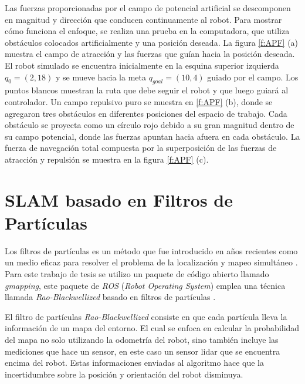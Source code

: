 Las fuerzas proporcionadas por el campo de potencial artificial se descomponen en 
magnitud y dirección que conducen continuamente al robot. Para mostrar cómo funciona el 
enfoque, se realiza una prueba en la computadora, que utiliza obstáculos 
colocados artificialmente y una posición deseada. La figura \ref{f:APF} (a) muestra el campo 
de atracción y las fuerzas que guían hacia la posición deseada. El robot simulado se 
encuentra inicialmente en la esquina superior izquierda $q_{0} = (2,18)$ y se mueve hacia 
la meta $q_{goal} = (10,4)$ guiado por el campo. Los puntos blancos muestran la ruta que debe 
seguir el robot y que luego guiará al controlador. Un campo repulsivo puro se muestra en 
\ref{f:APF} (b), donde se agregaron tres obstáculos en diferentes posiciones del espacio de 
trabajo. Cada obstáculo se proyecta como un círculo rojo debido a su gran magnitud dentro de 
su campo potencial, donde las fuerzas apuntan hacia afuera en cada obstáculo. La fuerza de 
navegación total compuesta por la superposición de las fuerzas de atracción y repulsión se 
muestra en la figura \ref{f:APF} (c).

\section{SLAM basado en Filtros de Part\'iculas}

Los filtros de partículas es un método que fue introducido en años recientes como un medio 
eficaz para resolver el problema de la localización y mapeo simultáneo 
\cite{nummiaro2003adaptive}. Para este trabajo de tesis se utilizo un paquete de código 
abierto llamado \textit{gmapping}, este paquete de \textit{ROS} (\textit{Robot Operating System}) 
emplea una técnica llamada \textit{Rao-Blackwellized} basado en filtros de partículas 
\cite{grisetti2007improved}.

El filtro de partículas \textit{Rao-Blackwellized} consiste en que cada partícula 
lleva la información de un mapa del entorno. El cual se enfoca en calcular la 
probabilidad del mapa no solo utilizando la odometría del robot, sino también incluye las 
mediciones que hace un sensor, en este caso un sensor lidar que se encuentra encima del 
robot. Estas informaciones enviadas al algoritmo hace que la incertidumbre sobre la 
posición y orientación del robot disminuya. 

